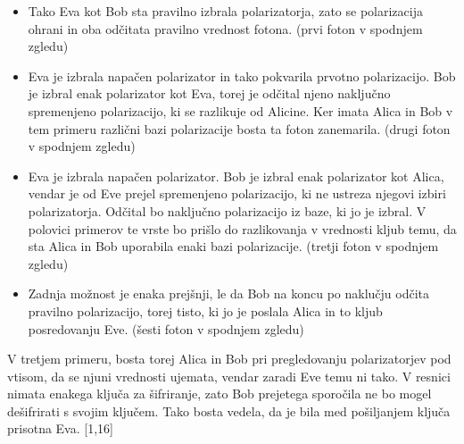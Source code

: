 \documentclass[A4paper, 11pt]{article}
\begin{document}
\begin{itemize}

\item Tako Eva kot Bob sta pravilno izbrala polarizatorja, zato se polarizacija ohrani in oba odčitata pravilno vrednost fotona. (prvi foton v spodnjem zgledu)

\item Eva je izbrala napačen polarizator in tako pokvarila prvotno polarizacijo. Bob je izbral enak polarizator kot Eva, torej je odčital njeno naključno spremenjeno polarizacijo, ki se razlikuje od Alicine. Ker imata Alica in Bob v tem primeru različni bazi polarizacije bosta ta foton zanemarila. (drugi foton v spodnjem zgledu)

\item Eva je izbrala napačen polarizator. Bob je izbral enak polarizator kot Alica, vendar je od Eve prejel spremenjeno polarizacijo, ki ne ustreza njegovi izbiri polarizatorja. Odčital bo naključno polarizacijo iz baze, ki jo je izbral. V polovici primerov te vrste bo prišlo do razlikovanja v vrednosti kljub temu, da sta Alica in Bob uporabila enaki bazi polarizacije. (tretji foton v spodnjem zgledu)

\item Zadnja možnost je enaka prejšnji, le da Bob na koncu po naklučju odčita pravilno polarizacijo, torej tisto, ki jo je poslala Alica in to kljub posredovanju Eve. (šesti foton v spodnjem zgledu)

\end{itemize}

V tretjem primeru, bosta torej Alica in Bob pri pregledovanju polarizatorjev pod vtisom, da se njuni vrednosti ujemata, vendar zaradi Eve temu ni tako. V resnici nimata enakega ključa za šifriranje, zato Bob prejetega sporočila ne bo mogel dešifrirati s svojim ključem. Tako bosta vedela, da je bila med pošiljanjem ključa prisotna Eva.  [1,16]

\pagebreak
\end{document}
